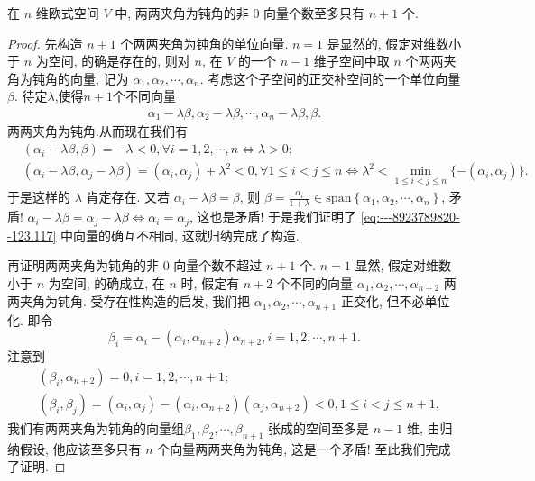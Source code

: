\documentclass[../../main.tex]{subfiles}
\begin{document}
\begin{example}
在 \( n \) 维欧式空间 \( V \) 中, 两两夹角为钝角的非 0 向量个数至多只有 \( n+1 \) 个.
\end{example}
\begin{proof}
先构造 \( n+1 \) 个两两夹角为钝角的单位向量. \( n=1 \) 是显然的, 假定对维数小于 \( n \) 为空间, 的确是存在的, 则对 \( n \), 在 \( V \) 的一个 \( n-1 \) 维子空间中取 \( n \) 个两两夹角为钝角的向量, 记为 \( \alpha_1, \alpha_2, \cdots, \alpha_n \). 考虑这个子空间的正交补空间的一个单位向量 \( \beta \). 待定$\lambda$,使得$n+1$个不同向量
\begin{align}
\alpha_1 - \lambda\beta, \alpha_2 - \lambda\beta, \cdots, \alpha_n - \lambda\beta, \beta. \label{eq:---8923789820--123.117}
\end{align}
两两夹角为钝角.从而现在我们有
\[
\begin{aligned}
&(\alpha_i - \lambda\beta, \beta) = -\lambda < 0, \forall i = 1, 2, \cdots, n \Leftrightarrow \lambda > 0; \\
&(\alpha_i - \lambda\beta, \alpha_j - \lambda\beta) = (\alpha_i, \alpha_j) + \lambda^2 < 0, \forall 1 \leqslant i < j \leqslant n \Leftrightarrow \lambda^2 < \min_{1 \leqslant i < j \leqslant n} \{ -(\alpha_i, \alpha_j) \}.
\end{aligned}
\]
于是这样的 \( \lambda \) 肯定存在. 又若 \( \alpha_i - \lambda\beta = \beta \), 则 \( \beta = \frac{\alpha_i}{1+\lambda} \in \mathrm{span}\left\{ \alpha _1,\alpha _2,\cdots ,\alpha _n \right\} \), 矛盾! \( \alpha_i - \lambda\beta = \alpha_j - \lambda\beta \Leftrightarrow \alpha_i = \alpha_j \), 这也是矛盾! 于是我们证明了 \eqref{eq:---8923789820--123.117} 中向量的确互不相同, 这就归纳完成了构造.

再证明两两夹角为钝角的非 0 向量个数不超过 \( n+1 \) 个. \( n=1 \) 显然, 假定对维数小于 \( n \) 为空间, 的确成立, 在 \( n \) 时, 假定有 \( n+2 \) 个不同的向量 \( \alpha_1, \alpha_2, \cdots, \alpha_{n+2} \) 两两夹角为钝角. 受存在性构造的启发, 我们把 \( \alpha_1, \alpha_2, \cdots, \alpha_{n+1} \) 正交化, 但不必单位化. 即令
\[
\beta_i = \alpha_i - (\alpha_i, \alpha_{n+2}) \alpha_{n+2}, i = 1, 2, \cdots, n+1.
\]
注意到
\[
\begin{aligned}
&(\beta_i, \alpha_{n+2}) = 0, i = 1, 2, \cdots, n+1; \\
&(\beta_i, \beta_j) = (\alpha_i, \alpha_j) - (\alpha_i, \alpha_{n+2})(\alpha_j, \alpha_{n+2}) < 0, 1 \leqslant i < j \leqslant n+1,
\end{aligned}
\]
我们有两两夹角为钝角的向量组\( \beta_1, \beta_2, \cdots, \beta_{n+1} \) 张成的空间至多是 \( n-1 \) 维, 由归纳假设, 他应该至多只有 \( n \) 个向量两两夹角为钝角, 这是一个矛盾! 至此我们完成了证明.

\end{proof}
\end{document}
